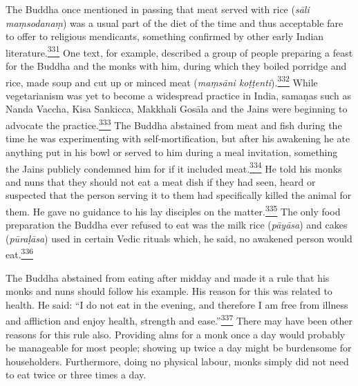 The Buddha once mentioned in passing that meat served with rice
(\emph{sāli maṃsodanaṃ}) was a usual part of the diet of the time and
thus acceptable fare to offer to religious mendicants, something
confirmed by other early Indian
literature.\label{footprints_split_011.html_fnref331}\hyperref[footprints_split_024.htmlux5cux23fn331]{\textsuperscript{331}}
One text, for example, described a group of people preparing a feast for
the Buddha and the monks with him, during which they boiled porridge and
rice, made soup and cut up or minced meat (\emph{maṃsāni
koṭṭenti}).\label{footprints_split_011.html_fnref332}\hyperref[footprints_split_024.htmlux5cux23fn332]{\textsuperscript{332}}
While vegetarianism was yet to become a widespread practice in India,
samaṇas such as Nanda Vaccha, Kisa Sankicca, Makkhali Gosāla and the
Jains were beginning to advocate the
practice.\label{footprints_split_011.html_fnref333}\hyperref[footprints_split_024.htmlux5cux23fn333]{\textsuperscript{333}}
The Buddha abstained from meat and fish during the time he was
experimenting with self-mortification, but after his awakening he ate
anything put in his bowl or served to him during a meal invitation,
something the Jains publicly condemned him for if it included
meat.\label{footprints_split_011.html_fnref334}\hyperref[footprints_split_024.htmlux5cux23fn334]{\textsuperscript{334}}
He told his monks and nuns that they should not eat a meat dish if they
had seen, heard or suspected that the person serving it to them had
specifically killed the animal for them. He gave no guidance to his lay
disciples on the
matter.\label{footprints_split_011.html_fnref335}\hyperref[footprints_split_024.htmlux5cux23fn335]{\textsuperscript{335}}
The only food preparation the Buddha ever refused to eat was the milk
rice (\emph{pāyāsa}) and cakes (\emph{pūraḷāsa}) used in certain Vedic
rituals which, he said, no awakened person would
eat.\label{footprints_split_011.html_fnref336}\hyperref[footprints_split_024.htmlux5cux23fn336]{\textsuperscript{336}}

The Buddha abstained from eating after midday and made it a rule that
his monks and nuns should follow his example. His reason for this was
related to health. He said: ``I do not eat in the evening, and therefore
I am free from illness and affliction and enjoy health, strength and
ease.''\label{footprints_split_011.html_fnref337}\hyperref[footprints_split_024.htmlux5cux23fn337]{\textsuperscript{337}}
There may have been other reasons for this rule also. Providing alms for
a monk once a day would probably be manageable for most people; showing
up twice a day might be burdensome for householders. Furthermore, doing
no physical labour, monks simply did not need to eat twice or three
times a day.

